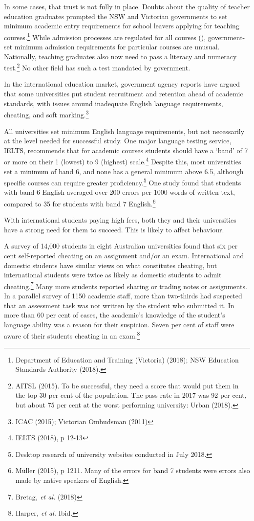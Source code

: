 \documentclass{grattan}
\begin{document}
In some cases, that trust is not fully in place. Doubts about the quality of teacher education graduates prompted the NSW and Victorian governments to set minimum academic entry requirements for school leavers applying for teaching courses.\footnote{Department of Education and Training (Victoria) (2018); NSW Education Standards Authority (2018).} While admission processes are regulated for all courses (), government-set minimum admission requirements for particular courses are unusual. Nationally, teaching graduates also now need to pass a literacy and numeracy test.\footnote{AITSL (2015). To be successful, they need a score that would put them in the top 30 per cent of the population. The pass rate in 2017 was 92 per cent, but about 75 per cent at the worst performing university: Urban (2018).} No other field has such a test mandated by government.

In the international education market, government agency reports have argued that some universities put student recruitment and retention ahead of academic standards, with issues around inadequate English language requirements, cheating, and soft marking.\footnote{ICAC (2015); Victorian Ombudsman (2011)}

All universities set minimum English language requirements, but not necessarily at the level needed for successful study. One major language testing service, IELTS, recommends that for academic courses students should have a `band' of 7 or more on their 1 (lowest) to 9 (highest) scale.\footnote{IELTS (2018), p 12-13} Despite this, most universities set a minimum of band 6, and none has a general minimum above 6.5, although specific courses can require greater proficiency.\footnote{Desktop research of university websites conducted in July 2018.} One study found that students with band 6 English averaged over 200 errors per 1000 words of written text, compared to 35 for students with band 7 English.\footnote{Müller (2015), p 1211. Many of the errors for band 7 students were errors also made by native speakers of English.}

With international students paying high fees, both they and their universities have a strong need for them to succeed. This is likely to affect behaviour.

A survey of 14,000 students in eight Australian universities found that six per cent self-reported cheating on an assignment and/or an exam. International and domestic students have similar views on what constitutes cheating, but international students were twice as likely as domestic students to admit cheating.\footnote{Bretag\emph{, et al.} (2018)} Many more students reported sharing or trading notes or assignments. In a parallel survey of 1150 academic staff, more than two-thirds had suspected that an assessment task was not written by the student who submitted it. In more than 60 per cent of cases, the academic's knowledge of the student's language ability was a reason for their suspicion. Seven per cent of staff were aware of their students cheating in an exam.\footnote{Harper\emph{, et al.} Ibid.}
\end{document}
